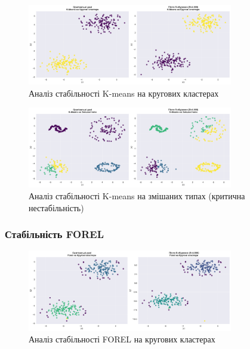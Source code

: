 \documentclass[12pt,a4paper]{article}
\begin{document}
\begin{figure}[H]
\centering
\includegraphics[width=0.8\textwidth]{clustering_visualizations/K-means_Кругові_кластери_stability.png}
\caption{Аналіз стабільності K-means на кругових кластерах}
\label{fig:kmeans_stability_circular}
\end{figure}

\begin{figure}[H]
\centering
\includegraphics[width=0.8\textwidth]{clustering_visualizations/K-means_Змішані_типи_stability.png}
\caption{Аналіз стабільності K-means на змішаних типах (критична нестабільність)}
\label{fig:kmeans_stability_mixed}
\end{figure}

\subsubsection{Стабільність FOREL}

\begin{figure}[H]
\centering
\includegraphics[width=0.8\textwidth]{clustering_visualizations/FOREL_Кругові_кластери_stability.png}
\caption{Аналіз стабільності FOREL на кругових кластерах}
\label{fig:forel_stability_circular}
\end{figure}
\end{document}
